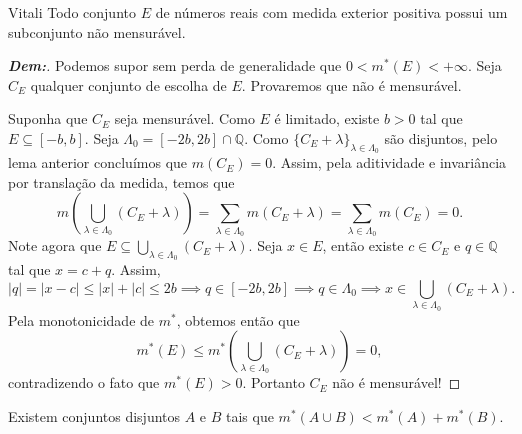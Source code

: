 \begin{theorem*}{Vitali}
Todo conjunto $E$ de números reais com medida exterior positiva possui um subconjunto não mensurável.
\end{theorem*}

\begin{proof}[\textbf{Dem:}]
Podemos supor sem perda de generalidade que $0 < m^*(E) < +\infty$. Seja $C_E$ qualquer conjunto de escolha de $E$. Provaremos que não é mensurável.

Suponha que $C_E$ seja mensurável. Como $E$ é limitado, existe $b > 0$ tal que $E \subseteq [-b, b]$.
Seja $\Lambda_0 = [-2b, 2b] \cap \mathbb{Q}$. Como $\{C_E + \lambda\}_{\lambda \in \Lambda_0}$ são disjuntos, pelo lema anterior concluímos que $m(C_E) = 0$.
Assim, pela aditividade e invariância por translação da medida, temos que
$$ m\left(\bigcup_{\lambda \in \Lambda_0} (C_E + \lambda)\right) = \sum_{\lambda \in \Lambda_0} m(C_E + \lambda) = \sum_{\lambda \in \Lambda_0} m(C_E) = 0. $$
Note agora que $E \subseteq \bigcup_{\lambda \in \Lambda_0} (C_E + \lambda)$. Seja $x \in E$, então existe $c \in C_E$ e $q \in \mathbb{Q}$ tal que $x = c + q$. Assim, 
$$ |q| = |x - c| \le |x| + |c| \le 2b \implies q \in [-2b, 2b] \implies q \in \Lambda_0 \implies x \in \bigcup_{\lambda \in \Lambda_0} (C_E + \lambda). $$
Pela monotonicidade de $m^*$, obtemos então que
$$ m^*(E) \le m^*\left(\bigcup_{\lambda \in \Lambda_0} (C_E + \lambda)\right) = 0, $$
contradizendo o fato que $m^*(E) > 0$. Portanto $C_E$ não é mensurável!
\end{proof}

\begin{corollary*}{}
Existem conjuntos disjuntos $A$ e $B$ tais que $m^*(A \cup B) < m^*(A) + m^*(B)$.
\end{corollary*}
